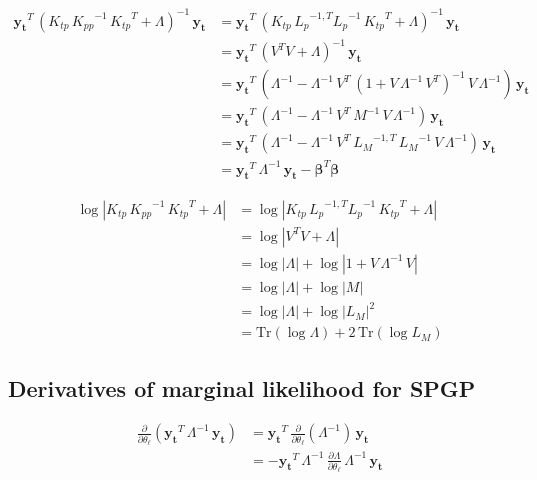 \documentclass[11pt,a4paper]{article}
\newcommand{\abs}[1]{\left| #1 \right|}
\newcommand{\tr}{\text{Tr}}
\numberwithin{equation}{section}
\begin{document}
\begin{align}
\mathbf{y_t}^T\,(K_{tp}\,{K_{pp}}^{-1}\,{K_{tp}}^T + \Lambda)^{-1}\,\mathbf{y_t}
 &= \mathbf{y_t}^T\,(K_{tp}\,{L_p}^{-1,T}{L_p}^{-1}\,{K_{tp}}^T + \Lambda)^{-1}\,\mathbf{y_t} \\
 &= \mathbf{y_t}^T\,(V^T V + \Lambda)^{-1}\,\mathbf{y_t} \\
 &= \mathbf{y_t}^T\,(\Lambda^{-1} - \Lambda^{-1}\,V^T\,(1 + V\,\Lambda^{-1}\,V^T)^{-1}\,V\,\Lambda^{-1})\,\mathbf{y_t} \\
 &= \mathbf{y_t}^T\,(\Lambda^{-1} - \Lambda^{-1}\,V^T\,M^{-1}\,V\,\Lambda^{-1})\,\mathbf{y_t} \\
 &= \mathbf{y_t}^T\,(\Lambda^{-1} - \Lambda^{-1}\,V^T\,{L_M}^{-1,T}\,{L_M}^{-1}\,V\,\Lambda^{-1})\,\mathbf{y_t} \\
 &= \mathbf{y_t}^T\,\Lambda^{-1}\,\mathbf{y_t} - {\bm \beta}^T{\bm \beta}
\end{align}

\begin{align}
\log \abs{K_{tp}\,{K_{pp}}^{-1}\,{K_{tp}}^T + \Lambda}
 &= \log \abs{K_{tp}\,{L_p}^{-1,T}{L_p}^{-1}\,{K_{tp}}^T + \Lambda} \\
 &= \log \abs{V^T V + \Lambda} \\
 &= \log \abs{\Lambda} + \log \abs{1 + V\,\Lambda^{-1}\,V} \\
 &= \log \abs{\Lambda} + \log \abs{M} \\
 &= \log \abs{\Lambda} + \log \abs{L_M}^2 \\
 &= \tr \left(\log \Lambda \right) + 2\,\tr \left(\log L_M \right)
\end{align}

\subsection{Derivatives of marginal likelihood for SPGP \label{APP:detail_mlik_der_spgp}}

\begin{align}
\frac{\partial}{\partial \theta_\ell}\left(\mathbf{y_t}^T\,\Lambda^{-1}\,\mathbf{y_t}\right)
  &= \mathbf{y_t}^T\,\frac{\partial}{\partial \theta_\ell}\left(\Lambda^{-1}\right)\,\mathbf{y_t} \\
  &= -\mathbf{y_t}^T\,\Lambda^{-1}\,\frac{\partial \Lambda}{\partial \theta_\ell}\,\Lambda^{-1}\,\mathbf{y_t}
\end{align}
\end{document}
